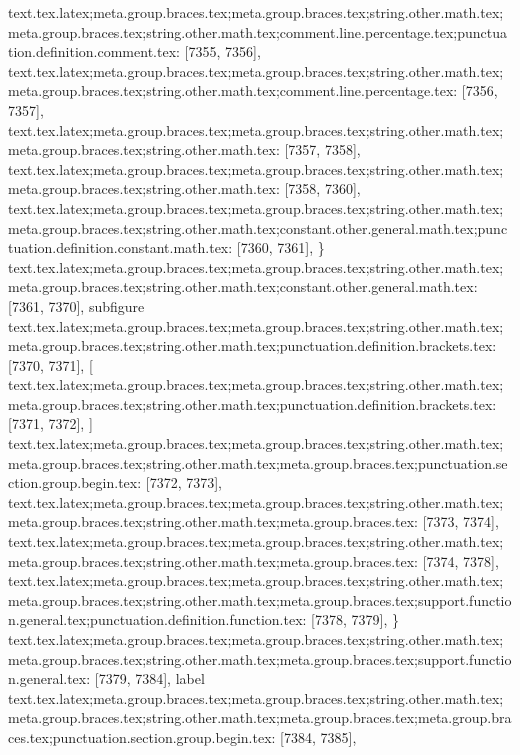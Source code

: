 {{{{{{{{{{{{{{{{{{{{{{{{{{{{{{{{{{{{{{{{{{{{{{{{{{{{{{{{{{{{{{{{{{{{{{{{{{{{{{{{{{{{{{{{{{{{{{{{{{{{{{{{{{{{{{{{{{{{{{{{{{{{{{{{{{{{{{{{{{{{{{{{{{{{{{{{{{{{{{{{{{{{{{{{{{{{{{{{{{{{{{{{{{{{{{{{{{{text.tex.latex;meta.group.braces.tex;meta.group.braces.tex;string.other.math.tex;meta.group.braces.tex;string.other.math.tex;comment.line.percentage.tex;punctuation.definition.comment.tex: [7355, 7356], {%
text.tex.latex;meta.group.braces.tex;meta.group.braces.tex;string.other.math.tex;meta.group.braces.tex;string.other.math.tex;comment.line.percentage.tex: [7356, 7357], {%
text.tex.latex;meta.group.braces.tex;meta.group.braces.tex;string.other.math.tex;meta.group.braces.tex;string.other.math.tex: [7357, 7358], {
}
text.tex.latex;meta.group.braces.tex;meta.group.braces.tex;string.other.math.tex;meta.group.braces.tex;string.other.math.tex: [7358, 7360], {  }
text.tex.latex;meta.group.braces.tex;meta.group.braces.tex;string.other.math.tex;meta.group.braces.tex;string.other.math.tex;constant.other.general.math.tex;punctuation.definition.constant.math.tex: [7360, 7361], {\}
text.tex.latex;meta.group.braces.tex;meta.group.braces.tex;string.other.math.tex;meta.group.braces.tex;string.other.math.tex;constant.other.general.math.tex: [7361, 7370], {subfigure}
text.tex.latex;meta.group.braces.tex;meta.group.braces.tex;string.other.math.tex;meta.group.braces.tex;string.other.math.tex;punctuation.definition.brackets.tex: [7370, 7371], {[}
text.tex.latex;meta.group.braces.tex;meta.group.braces.tex;string.other.math.tex;meta.group.braces.tex;string.other.math.tex;punctuation.definition.brackets.tex: [7371, 7372], {]}
text.tex.latex;meta.group.braces.tex;meta.group.braces.tex;string.other.math.tex;meta.group.braces.tex;string.other.math.tex;meta.group.braces.tex;punctuation.section.group.begin.tex: [7372, 7373], {{}
text.tex.latex;meta.group.braces.tex;meta.group.braces.tex;string.other.math.tex;meta.group.braces.tex;string.other.math.tex;meta.group.braces.tex: [7373, 7374], {
}
text.tex.latex;meta.group.braces.tex;meta.group.braces.tex;string.other.math.tex;meta.group.braces.tex;string.other.math.tex;meta.group.braces.tex: [7374, 7378], {    }
text.tex.latex;meta.group.braces.tex;meta.group.braces.tex;string.other.math.tex;meta.group.braces.tex;string.other.math.tex;meta.group.braces.tex;support.function.general.tex;punctuation.definition.function.tex: [7378, 7379], {\}
text.tex.latex;meta.group.braces.tex;meta.group.braces.tex;string.other.math.tex;meta.group.braces.tex;string.other.math.tex;meta.group.braces.tex;support.function.general.tex: [7379, 7384], {label}
text.tex.latex;meta.group.braces.tex;meta.group.braces.tex;string.other.math.tex;meta.group.braces.tex;string.other.math.tex;meta.group.braces.tex;meta.group.braces.tex;punctuation.section.group.begin.tex: [7384, 7385], {{}
}}}}}}}}}}}}}}}}}}}}}}}}}}}}}}}}}}}}}}}}}}}}}}}}}}}}}}}}}}}}}}}}}}}}}}}}}}}}}}}}}}}}}}}}}}}}}}}}}}}}}}}}}}}}}}}}}}}}}}}}}}}}}}}}}}}}}}}}}}}}}}}}}}}}}}}}}}}}}}}}}}}}}}}}}}}}}}}}}}}}}}}}}}}}}}}}}}}}}}}}}
